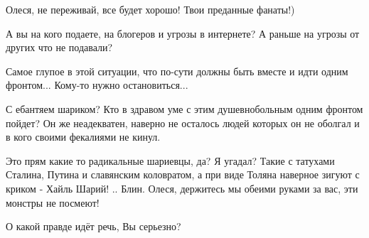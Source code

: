 \begin{itemize}
Олеся, не переживай, все будет хорошо! Твои преданные фанаты!)


 

А вы на кого подаете, на блогеров и угрозы в интернете? А раньше на угрозы от
других что не подавали?


Самое глупое в этой ситуации, что по-сути должны быть вместе и идти одним
фронтом... Кому-то нужно остановиться...

\begin{itemize}
 
С ебантяем шариком? Кто в здравом уме с этим душевнобольным одним фронтом пойдет? Он же неадекватен, наверно не осталось людей которых он не оболгал и в кого своими фекалиями не кинул.
\end{itemize}

 

Это прям какие то радикальные шариевцы, да? Я угадал? Такие с татухами Сталина,
Путина и славянским коловратом, а при виде Толяна наверное зигуют с криком -
Хайль Шарий! .. Блин. Олеся, держитесь мы обеими руками за вас, эти монстры не
посмеют!


 
О какой правде идёт речь, Вы серьезно?

 

\end{itemize}
